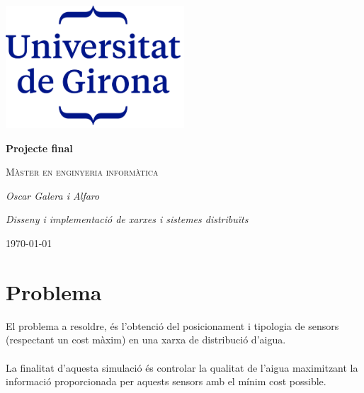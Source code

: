 \documentclass[12pt]{article}
\begin{document}
\begin{titlepage}
		\centering
		\includegraphics[width=0.5\textwidth]{imatges/logo.png}\par\vspace{1cm}
		{\huge\bfseries Projecte final\par}
		\vspace{1cm}
		{\scshape\Large Màster en enginyeria informàtica\par}
		\vspace{1.5cm}
		{\Large\itshape Oscar Galera i Alfaro\par}
		\vspace{1cm}
		{\Large\itshape Disseny i implementació de xarxes i sistemes distribuïts\par}
		\vspace{2cm}
		\vfill
		\vfill
		{\large \today\par}
\end{titlepage}
\clearpage
\tableofcontents
\clearpage
\listoffigures

\clearpage
\section{Problema\label{problema}}
El problema a resoldre, és l'obtenció del posicionament i tipologia de sensors (respectant un cost màxim) en una xarxa de distribució d'aigua. 
\\\\La finalitat d'aquesta simulació és controlar la qualitat de l'aigua maximitzant la informació proporcionada per aquests sensors amb el mínim cost possible.
\end{document}
